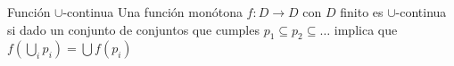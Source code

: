 %
%

\begin{definicion}{Función $\cup$-continua}
Una función monótona $f:D\to D$ con $D$ finito es $\cup$-continua si dado un conjunto de conjuntos que cumples $p_1\subseteq p_2\subseteq\dots$ implica que $f(\bigcup_i p_i) = \bigcup f(p_i)$
\end{definicion}

